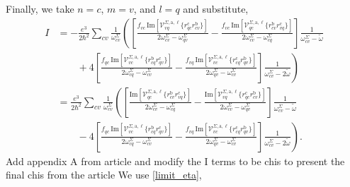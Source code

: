 Finally, we take $n = c$, $m = v$, and $l = q$ and substitute,
\begin{align*}
I &= -\frac{e^3}{2\hbar^2}\sum_{cv}\frac{1}{\omega^\Sigma_{cv}}
  \left(\left[
  \frac{f_{vc}\,\mathrm{Im}\left[\mathcal{V}^{\Sigma,\text{a},\ell}_{vq}
        \{r^{\text{c}}_{qc}
        r^{\text{b}}_{cv}\}\right]}
        {2\omega^\Sigma_{cv}-\omega^\Sigma_{qv}}
 -\frac{f_{vc}\,\mathrm{Im}\left[\mathcal{V}^{\Sigma,\text{a},\ell}_{qc}
        \{r^{\text{b}}_{cv}
        r^{\text{c}}_{vq}\}\right]}
        {2\omega^\Sigma_{cv}-\omega^\Sigma_{cq}}
\right]\frac{1}{\omega^\Sigma_{cv}-\tilde\omega}\right.\nonumber\\
&\qquad
+4\left.\left[
  \frac{f_{qc}\,\mathrm{Im}\left[\mathcal{V}^{\Sigma,\text{a},\ell}_{vc}
        \{r^{\text{b}}_{cq}
        r^{\text{c}}_{qv}\}\right]}
        {2\omega^\Sigma_{cq}-\omega^\Sigma_{cv}}
 -\frac{f_{vq}\,\mathrm{Im}\left[\mathcal{V}^{\Sigma,\text{a},\ell}_{vc}
        \{r^{\text{c}}_{cq}
        r^{\text{b}}_{qv}\}\right]}
        {2\omega^\Sigma_{qv}-\omega^\Sigma_{cv}}
\right]\frac{1}{\omega^\Sigma_{cv}-2\tilde\omega}\right)\nonumber\\
&= \frac{e^3}{2\hbar^2}\sum_{cv}\frac{1}{\omega^\Sigma_{cv}}
\left(\left[
 \frac{\mathrm{Im}\left[\mathcal{V}^{\Sigma,\text{a},\ell}_{qc}
        \{r^{\text{b}}_{cv}
        r^{\text{c}}_{vq}\}\right]}
        {2\omega^\Sigma_{cv}-\omega^\Sigma_{cq}}
 -\frac{\mathrm{Im}\left[\mathcal{V}^{\Sigma,\text{a},\ell}_{vq}
        \{r^{\text{c}}_{qc}
        r^{\text{b}}_{cv}\}\right]}
        {2\omega^\Sigma_{cv}-\omega^\Sigma_{qv}}
\right]\frac{1}{\omega^\Sigma_{cv}-\tilde\omega}\right.\nonumber\\
&\qquad-4
\left.\left[
  \frac{f_{qc}\,\mathrm{Im}\left[\mathcal{V}^{\Sigma,\text{a},\ell}_{vc}
        \{r^{\text{b}}_{cq}
        r^{\text{c}}_{qv}\}\right]}
        {2\omega^\Sigma_{cq}-\omega^\Sigma_{cv}}
 -\frac{f_{vq}\,\mathrm{Im}\left[\mathcal{V}^{\Sigma,\text{a},\ell}_{vc}
        \{r^{\text{c}}_{cq}
        r^{\text{b}}_{qv}\}\right]}
        {2\omega^\Sigma_{qv}-\omega^\Sigma_{cv}}
\right]\frac{1}{\omega^\Sigma_{cv}-2\tilde\omega}\right).
\end{align*}
{\color{red} Add appendix A from article and modify the I terms to be chis to present the final chis from the article}
We use \eqref{limit_eta},
